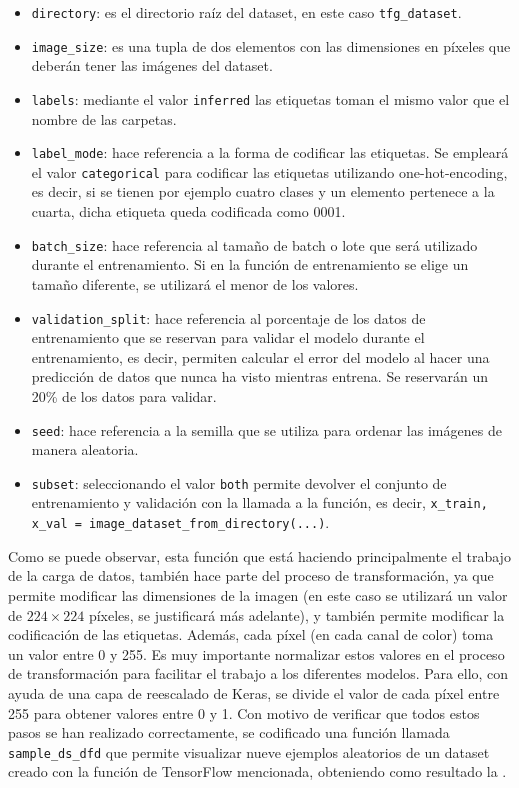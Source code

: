 			\begin{itemize}
				\item \texttt{directory}: es el directorio raíz del dataset, en este caso \texttt{tfg\_dataset}. 
				\item \texttt{image\_size}: es una tupla de dos elementos con las dimensiones en píxeles que deberán tener las imágenes del dataset. 
				\item \texttt{labels}: mediante el valor \texttt{inferred} las etiquetas toman el mismo valor que el nombre de las carpetas. 
				\item \texttt{label\_mode}: hace referencia a la forma de codificar las etiquetas. Se empleará el valor \texttt{categorical} para codificar las etiquetas utilizando one-hot-encoding, es decir, si se tienen por ejemplo cuatro clases y un elemento pertenece a la cuarta, dicha etiqueta queda codificada como 0001. 
				\item \texttt{batch\_size}: hace referencia al tamaño de batch o lote que será utilizado durante el entrenamiento. Si en la función de entrenamiento se elige un tamaño diferente, se utilizará el menor de los valores. 
				\item \texttt{validation\_split}: hace referencia al porcentaje de los datos de entrenamiento que se reservan para validar el modelo durante el entrenamiento, es decir, permiten calcular el error del modelo al hacer una predicción de datos que nunca ha visto mientras entrena. Se reservarán un 20\% de los datos para validar. 
				\item \texttt{seed}: hace referencia a la semilla que se utiliza para ordenar las imágenes de manera aleatoria. 
				\item \texttt{subset}: seleccionando el valor \texttt{both} permite devolver el conjunto de entrenamiento y validación con la llamada a la función, es decir, \texttt{x\_train, x\_val = image\_dataset\_from\_directory(...)}. 
			\end{itemize}
			
			Como se puede observar, esta función que está haciendo principalmente el trabajo de la carga de datos, también hace parte del proceso de transformación, ya que permite modificar las dimensiones de la imagen (en este caso se utilizará un valor de $224 \times 224$ píxeles, se justificará más adelante), y también permite modificar la codificación de las etiquetas. Además, cada píxel (en cada canal de color) toma un valor entre 0 y 255. Es muy importante normalizar estos valores en el proceso de transformación para facilitar el trabajo a los diferentes modelos. Para ello, con ayuda de una capa de reescalado de Keras, se divide el valor de cada píxel entre 255 para obtener valores entre 0 y 1. Con motivo de verificar que todos estos pasos se han realizado correctamente, se codificado una función llamada \texttt{sample\_ds\_dfd} que permite visualizar nueve ejemplos aleatorios de un dataset creado con la función de TensorFlow mencionada, obteniendo como resultado la . \\
			
